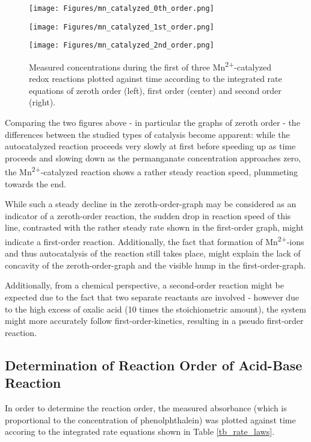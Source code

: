 \documentclass[titlepage]{article}
\begin{document}
%
\begin{figure}[H]
    \centering
    \begin{minipage}[c]{0.32\textwidth}
        \texttt{[image: Figures/mn\_catalyzed\_0th\_order.png]}
    \end{minipage}
    \begin{minipage}[c]{0.32\textwidth}
        \texttt{[image: Figures/mn\_catalyzed\_1st\_order.png]}
    \end{minipage}
    \begin{minipage}[c]{0.32\textwidth}
        \texttt{[image: Figures/mn\_catalyzed\_2nd\_order.png]}
    \end{minipage}
    \caption{Measured concentrations during the first of three Mn\textsuperscript{2+}-catalyzed redox reactions plotted against time according to the integrated rate equations of zeroth order (left), first order (center) and second order (right).}
    \label{fig_kmno_mn_catalyzed_rates}
\end{figure}
%
\noindent Comparing the two figures above - in particular the graphs of zeroth order - the differences between the studied types of catalysis become apparent: while the autocatalyzed reaction proceeds very slowly at first before speeding up as time proceeds and slowing down as the permanganate concentration approaches zero, the Mn\textsuperscript{2+}-catalyzed reaction shows a rather steady reaction speed, plummeting towards the end.

While such a steady decline in the zeroth-order-graph may be considered as an indicator of a zeroth-order reaction, the sudden drop in reaction speed of this line, contrasted with the rather steady rate shown in the first-order graph, might indicate a first-order reaction. Additionally, the fact that formation of Mn\textsuperscript{2+}-ions and thus autocatalysis of the reaction still takes place, might explain the lack of concavity of the zeroth-order-graph and the visible hump in the first-order-graph.

Additionally, from a chemical perspective, a second-order reaction might be expected due to the fact that two separate reactants are involved - however due to the high excess of oxalic acid (10 times the stoichiometric amount), the system might more accurately follow first-order-kinetics, resulting in a pseudo first-order reaction.

\subsection{Determination of Reaction Order of Acid-Base Reaction}
In order to determine the reaction order, the measured absorbance (which is proportional to the concentration of phenolphthalein) was plotted against time accoring to the integrated rate equations shown in Table \ref{tb_rate_laws}.
\end{document}
